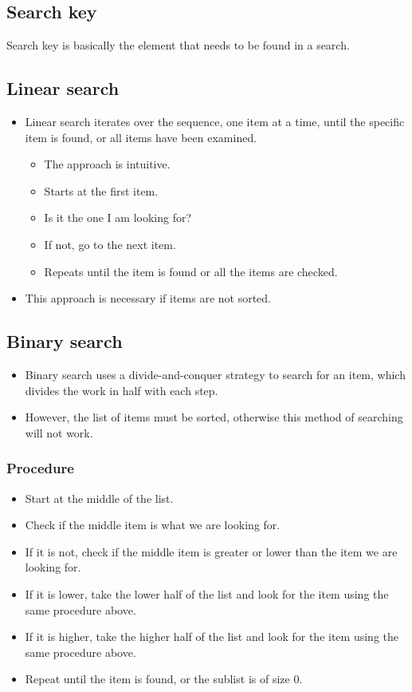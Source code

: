 \documentclass[11pt]{article}
\begin{document}
\subsection{Search key}
\label{sec:org3f48778}
Search key is basically the element that needs to be found in a search.

\subsection{Linear search}
\label{sec:orgfa9f86b}
\begin{itemize}
\item Linear search iterates over the sequence, one item at a time, until the specific item is found, or all items have been examined.
\begin{itemize}
\item The approach is intuitive.
\item Starts at the first item.
\item Is it the one I am looking for?
\item If not, go to the next item.
\item Repeats until the item is found or all the items are checked.
\end{itemize}

\item This approach is necessary if items are not sorted.
\end{itemize}

 \newpage

\subsection{Binary search}
\label{sec:org2956525}
\begin{itemize}
\item Binary search uses a divide-and-conquer strategy to search for an item, which divides the work in half with each step.
\item However, the list of items must be sorted, otherwise this method of searching will not work.
\end{itemize}

\subsubsection{Procedure}
\label{sec:orga7aeafe}
\begin{itemize}
\item Start at the middle of the list.
\item Check if the middle item is what we are looking for.
\item If it is not, check if the middle item is greater or lower than the item we are looking for.
\item If it is lower, take the lower half of the list and look for the item using the same procedure above.
\item If it is higher, take the higher half of the list and look for the item using the same procedure above.
\item Repeat until the item is found, or the sublist is of size 0.
\end{itemize}
\end{document}
